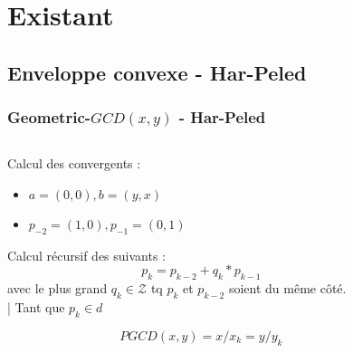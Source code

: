 \documentclass{beamer}
\begin{document}
\section{Existant}

\subsection{Enveloppe convexe - Har-Peled}
\begin{frame}
\frametitle{Geometric-$GCD(x, y)$ - Har-Peled}

\begin{columns}[t]
  \begin{column}{6cm}
    \begin{block}{}
      Calcul des convergents :
      \begin{itemize}
        \item $a = (0,0), b = (y, x)$
        \item $p_{-2} = (1,0), p_{-1} = (0,1)$
      \end{itemize}

      Calcul récursif des suivants :
      \vspace{-0.2cm} 
      \alert{$$ p_{k} = p_{k-2} + q_{k}*p_{k-1}$$}
      avec le plus grand $q_{k} \in \mathcal{Z}$ tq $p_{k}$ et $p_{k-2}$ soient du même côté.\\
      \vspace{0.2cm}
      | Tant que $ p_{k} \in d$
    \end{block}
    \begin{alertblock}{}
      \vspace{-0.2cm} 
      $$ PGCD(x, y) = x/ x_{k} = y/ y_{k}$$
      \vspace{-0.2cm} 
    \end{alertblock}
  \end{column}

  \begin{column}{4cm}
    

\end{column}
\end{columns}
\end{frame}
\end{document}
